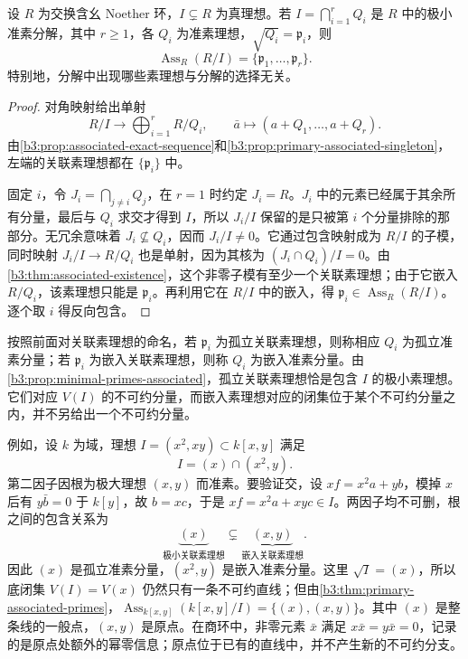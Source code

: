 \begin{theorem}\label{b3:thm:primary-associated-primes}
	设 \(R\) 为交换含幺 Noether 环，\(I\subsetneq R\) 为真理想。若 \(I=\bigcap_{i=1}^rQ_i\) 是 \(R\) 中的极小准素分解，其中 \(r\ge1\)，各 \(Q_i\) 为准素理想，\(\sqrt{Q_i}=\mathfrak p_i\)，则
	\[
		\operatorname{Ass}_R(R/I)=\{\mathfrak p_1,\ldots,\mathfrak p_r\}.
	\]
	特别地，分解中出现哪些素理想与分解的选择无关。
\end{theorem}
\begin{proof}
	对角映射给出单射
	\[
		R/I\longrightarrow\bigoplus_{i=1}^rR/Q_i,\qquad \bar a\longmapsto(a+Q_1,\ldots,a+Q_r).
	\]
	由\cref{b3:prop:associated-exact-sequence}和\cref{b3:prop:primary-associated-singleton}，左端的关联素理想都在 \(\{\mathfrak p_i\}\) 中。

	固定 \(i\)，令 \(J_i=\bigcap_{j\ne i}Q_j\)，在 \(r=1\) 时约定 \(J_i=R\)。\(J_i\) 中的元素已经属于其余所有分量，最后与 \(Q_i\) 求交才得到 \(I\)，所以 \(J_i/I\) 保留的是只被第 \(i\) 个分量排除的那部分。无冗余意味着 \(J_i\not\subseteq Q_i\)，因而 \(J_i/I\ne0\)。它通过包含映射成为 \(R/I\) 的子模，同时映射 \(J_i/I\rightarrow R/Q_i\) 也是单射，因为其核为 \((J_i\cap Q_i)/I=0\)。由\cref{b3:thm:associated-existence}，这个非零子模有至少一个关联素理想；由于它嵌入 \(R/Q_i\)，该素理想只能是 \(\mathfrak p_i\)。再利用它在 \(R/I\) 中的嵌入，得 \(\mathfrak p_i\in\operatorname{Ass}_R(R/I)\)。逐个取 \(i\) 得反向包含。
\end{proof}

按照前面对关联素理想的命名，若 \(\mathfrak p_i\) 为孤立关联素理想，则称相应 \(Q_i\) 为孤立准素分量；若 \(\mathfrak p_i\) 为嵌入关联素理想，则称 \(Q_i\) 为嵌入准素分量。由\cref{b3:prop:minimal-primes-associated}，孤立关联素理想恰是包含 \(I\) 的极小素理想。它们对应 \(V(I)\) 的不可约分量，而嵌入素理想对应的闭集位于某个不可约分量之内，并不另给出一个不可约分量。

\ProseParagraphBreak
例如，设 \(k\) 为域，理想 \(I=(x^2,xy)\subset k[x,y]\) 满足
\begin{equation}\label{b3:eq:embedded-line-decomposition}
	I=(x)\cap(x^2,y).
\end{equation}
第二因子因根为极大理想 \((x,y)\) 而准素。要验证交，设 \(xf=x^2a+yb\)，模掉 \(x\) 后有 \(y\bar b=0\) 于 \(k[y]\)，故 \(b=xc\)，于是 \(xf=x^2a+xyc\in I\)。两因子均不可删，根之间的包含关系为
\[
	\underbrace{(x)}_{\text{极小关联素理想}} \subsetneq \underbrace{(x,y)}_{\text{嵌入关联素理想}}.
\]
因此 \((x)\) 是孤立准素分量，\((x^2,y)\) 是嵌入准素分量。这里 \(\sqrt I=(x)\)，所以底闭集 \(V(I)=V(x)\) 仍然只有一条不可约直线；但由\cref{b3:thm:primary-associated-primes}，\(\operatorname{Ass}_{k[x,y]}(k[x,y]/I)=\{(x),(x,y)\}\)。其中 \((x)\) 是整条线的一般点，\((x,y)\) 是原点。在商环中，非零元素 \(\bar x\) 满足 \(x\bar x=y\bar x=0\)，记录的是原点处额外的幂零信息；原点位于已有的直线中，并不产生新的不可约分支。

